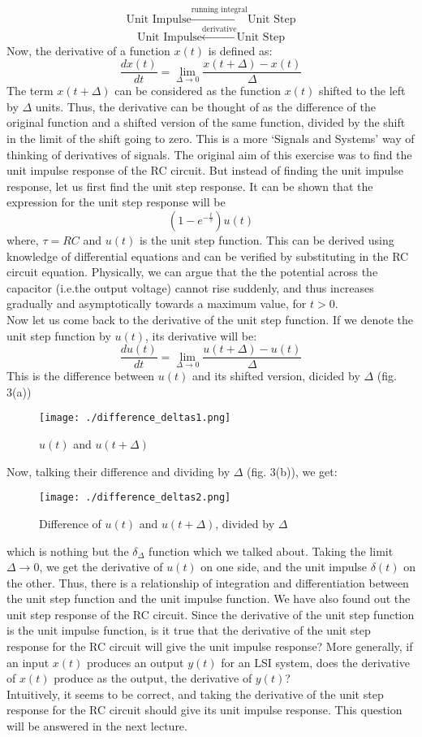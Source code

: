 $$\textrm{Unit Impulse}\xrightarrow {\textrm{running integral}} \textrm{Unit Step}$$
$$\textrm{Unit Impulse}\xleftarrow {\textrm{derivative}} \textrm{Unit Step}$$
\indent Now, the derivative of a function $x(t)$ is defined as:
$$\frac{dx(t)}{dt}=\lim_{\Delta\rightarrow 0}\frac{x(t+\Delta)-x(t)}{\Delta}$$
\indent	The term $x(t+\Delta)$ can be considered as the function $x(t)$ shifted to the left by $\Delta$ units. Thus, the derivative can be thought of as the difference of the original function and a shifted version of the same function, divided by the shift in the limit of the shift going to zero. This is a more `Signals and Systems' way of thinking of derivatives of signals. The original aim of this exercise was to find the unit impulse response of the RC circuit. But instead of finding the unit impulse response, let us first find the unit step response. It can be shown that the expression for the unit step response will be $$(1-e^{-\frac{t}{\tau}})u(t)$$
where, $\tau=RC$ and $u(t)$ is the unit step function. This can be derived using knowledge of differential equations and can be verified by substituting in the RC circuit equation. Physically, we can argue that the the potential across the capacitor (i.e.the output voltage) cannot rise suddenly, and thus increases gradually and asymptotically towards a maximum value, for $t>0$.\\
\indent Now let us come back to the derivative of the unit step function. If we denote the unit step function by $u(t)$, its derivative will be:
$$\frac{du(t)}{dt}=\lim _{\Delta\rightarrow0}\frac{u(t+\Delta)-u(t)}{\Delta}$$
This is the difference between $u(t)$ and its shifted version, dicided by $\Delta$ (fig. 3(a))
\begin{figure}[H]
	\centering
	\texttt{[image: ./difference\_deltas1.png]}
	\caption{$u(t)$ and $u(t+\Delta)$}
\end{figure}
\indent	Now, talking their difference and dividing by $\Delta$ (fig. 3(b)), we get: 
\begin{figure}[H]
	\centering
	\texttt{[image: ./difference\_deltas2.png]}
	\caption{Difference of $u(t)$ and $u(t+\Delta)$, divided by $\Delta$}
\end{figure}
\indent which is nothing but the $\delta_\Delta$ function which we talked about. Taking the limit $\Delta\rightarrow0$, we get the derivative of $u(t)$ on one side, and the unit impulse $\delta(t)$ on the other.
Thus, there is a relationship of integration and differentiation between the unit step function and the unit impulse function. We have also found out the unit step response of the RC circuit. Since the derivative of the unit step function is the unit impulse function, is it true that the derivative of the unit step response for the RC circuit will give the unit impulse response?
More generally, if an input $x(t)$ produces an output $y(t)$ for an LSI system, does the derivative of $x(t)$ produce as the output, the derivative of $y(t)$?\\
\indent Intuitively, it seems to be correct, and taking the derivative of the unit step response for the RC circuit should give its unit impulse response. This question will be answered in the next lecture.
